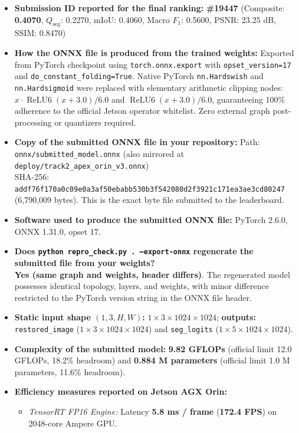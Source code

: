 \documentclass{article}
\begin{document}
\begin{itemize}[leftmargin=*]
\item \textbf{Submission ID reported for the final ranking:} \textbf{\#19447} (Composite: \textbf{0.4070}, $Q_{\text{seg}}$: 0.2270, mIoU: 0.4060, Macro $F_1$: 0.5600, PSNR: 23.25 dB, SSIM: 0.8470)
\item \textbf{How the ONNX file is produced from the trained weights:}
  Exported from PyTorch checkpoint using \texttt{torch.onnx.export} with \texttt{opset\_version=17} and \texttt{do\_constant\_folding=True}. Native PyTorch \texttt{nn.Hardswish} and \texttt{nn.Hardsigmoid} were replaced with elementary arithmetic clipping nodes: $x \cdot \operatorname{ReLU6}(x + 3.0) / 6.0$ and $\operatorname{ReLU6}(x + 3.0) / 6.0$, guaranteeing 100\% adherence to the official Jetson operator whitelist. Zero external graph post-processing or quantizers required.
\item \textbf{Copy of the submitted ONNX file in your repository:}
  Path: \texttt{onnx/submitted\_model.onnx} (also mirrored at \texttt{deploy/track2\_apex\_orin\_v3.onnx}) \\
  SHA-256: \texttt{addf76f170a0c09e0a3af50ebabb530b3f542080d2f3921c171ea3ae3cd80247} (6,790,009 bytes). This is the exact byte file submitted to the leaderboard.
\item \textbf{Software used to produce the submitted ONNX file:} PyTorch 2.6.0, ONNX 1.31.0, opset 17.
\item \textbf{Does \texttt{python repro\_check.py . --export-onnx} regenerate the submitted file from your weights?} \\
  \textbf{Yes (same graph and weights, header differs)}. The regenerated model possesses identical topology, layers, and weights, with minor difference restricted to the PyTorch version string in the ONNX file header.
\item \textbf{Static input shape $(1,3,H,W)$:} $1 \times 3 \times 1024 \times 1024$; \textbf{outputs:} \texttt{restored\_image} ($1 \times 3 \times 1024 \times 1024$) and \texttt{seg\_logits} ($1 \times 5 \times 1024 \times 1024$).
\item \textbf{Complexity of the submitted model:} \textbf{9.82 GFLOPs} (official limit 12.0 GFLOPs, 18.2\% headroom) and \textbf{0.884 M parameters} (official limit 1.0 M parameters, 11.6\% headroom).
\item \textbf{Efficiency measures reported on Jetson AGX Orin:}
  \begin{itemize}
    \item \emph{TensorRT FP16 Engine:} Latency \textbf{5.8 ms / frame} (\textbf{172.4 FPS}) on 2048-core Ampere GPU.

\end{itemize}
\end{itemize}
\end{document}
